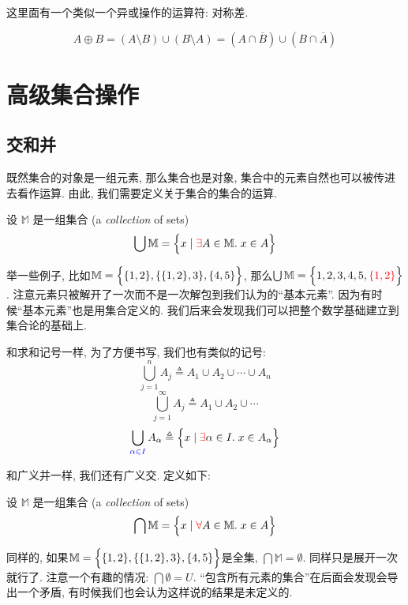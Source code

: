 这里面有一个类似一个异或操作的运算符: 对称差. 

\begin{definition}
  \[
    A \oplus B = (A \setminus B) \cup (B \setminus A)
      = (A \cap \overline{B}) \cup (B \cap \overline{A})
  \]
\end{definition}

\section{高级集合操作}
\subsection{交和并}

既然集合的对象是一组元素, 那么集合也是对象, 集合中的元素自然也可以被传进去看作运算. 由此, 我们需要定义关于集合的集合的运算. 

\begin{definition}
  设 $\mathbb{M}$ 是一组集合 (a {\it collection} of sets)
  \[
    \bigcup \mathbb{M} = \Big\{x \mid \textcolor{red}{\exists} A \in \mathbb{M}.\; x \in A\Big\}
  \]
\end{definition}

举一些例子, 比如$\mathbb{M} = \Big\{\{1, 2\}, \{\{1, 2\}, 3\}, \{4, 5\}\Big\}$, 那么$\bigcup \mathbb{M} = \Big\{1, 2, 3, 4, 5, \textcolor{red}{\{1, 2\}}\Big\}$. 注意元素只被解开了一次而不是一次解包到我们认为的``基本元素''. 因为有时候``基本元素''也是用集合定义的. 我们后来会发现我们可以把整个数学基础建立到集合论的基础上. 

和求和记号一样, 为了方便书写, 我们也有类似的记号: 
  \[
    \bigcup_{j = 1}^{n} A_j \triangleq A_1 \cup A_2 \cup \cdots \cup A_n
  \]
  \[
    \bigcup_{j = 1}^{\infty} A_j \triangleq A_1 \cup A_2 \cup \cdots
  \]
  \[
    \bigcup_{\textcolor{blue}{\alpha \in I}} A_{\alpha} \triangleq
      \Big\{x \mid \textcolor{red}{\exists} \alpha \in I.\; x \in A_{\alpha}\Big\}
  \]

和广义并一样, 我们还有广义交. 定义如下: 
\begin{definition}
  设 $\mathbb{M}$ 是一组集合 (a {\it collection} of sets)
  \[
    \bigcap \mathbb{M} = \Big\{x \mid \textcolor{red}{\forall} A \in \mathbb{M}.\; x \in A\Big\}
  \]
\end{definition}

同样的, 如果$\mathbb{M} = \Big\{\{1, 2\}, \{\{1, 2\}, 3\}, \{4, 5\}\Big\}$是全集,  $\bigcap \mathbb{M} = \emptyset$. 同样只是展开一次就行了. 注意一个有趣的情况: $\bigcap \emptyset =U$. ``包含所有元素的集合''在后面会发现会导出一个矛盾, 有时候我们也会认为这样说的结果是未定义的. 

